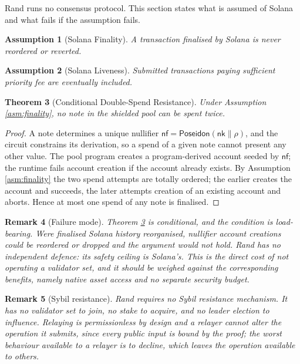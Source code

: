 \documentclass[11pt,a4paper]{article}
\newtheorem{theorem}{Theorem}[section]
\newtheorem{assumption}[theorem]{Assumption}
\newtheorem{remark}[theorem]{Remark}
\begin{document}
Rand runs no consensus protocol. This section states what is assumed of Solana and what fails if the assumption fails.

\begin{assumption}[Solana Finality]
\label{ass:finality}
\label{asm:finality}
A transaction finalised by Solana is never reordered or reverted.
\end{assumption}

\begin{assumption}[Solana Liveness]
\label{ass:liveness}
Submitted transactions paying sufficient priority fee are eventually included.
\end{assumption}

\begin{theorem}[Conditional Double-Spend Resistance]
\label{thm:nodouble}
Under Assumption \ref{asm:finality}, no note in the shielded pool can be spent twice.
\end{theorem}

\begin{proof}
A note determines a unique nullifier $\mathsf{nf} = \mathsf{Poseidon}(\mathsf{nk} \| \rho)$, and the circuit constrains its derivation, so a spend of a given note cannot present any other value. The pool program creates a program-derived account seeded by $\mathsf{nf}$; the runtime fails account creation if the account already exists. By Assumption \ref{asm:finality} the two spend attempts are totally ordered; the earlier creates the account and succeeds, the later attempts creation of an existing account and aborts. Hence at most one spend of any note is finalised.
\end{proof}

\begin{remark}[Failure mode]
Theorem \ref{thm:nodouble} is conditional, and the condition is load-bearing. Were finalised Solana history reorganised, nullifier account creations could be reordered or dropped and the argument would not hold. Rand has no independent defence: its safety ceiling is Solana's. This is the direct cost of not operating a validator set, and it should be weighed against the corresponding benefits, namely native asset access and no separate security budget.
\end{remark}

\begin{remark}[Sybil resistance]
Rand requires no Sybil resistance mechanism. It has no validator set to join, no stake to acquire, and no leader election to influence. Relaying is permissionless by design and a relayer cannot alter the operation it submits, since every public input is bound by the proof; the worst behaviour available to a relayer is to decline, which leaves the operation available to others.
\end{remark}
\end{document}

